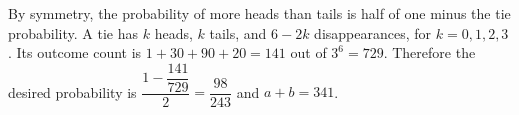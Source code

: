By symmetry, the probability of more heads than tails is half of one minus the tie probability. A tie has $k$ heads, $k$ tails, and $6-2k$ disappearances, for $k=0,1,2,3$. Its outcome count is $1+30+90+20=141$ out of $3^6=729$. Therefore the desired probability is $\dfrac{1-\dfrac{141}{729}}{2}=\dfrac{98}{243}$ and $\boxed{a+b=341}$.
